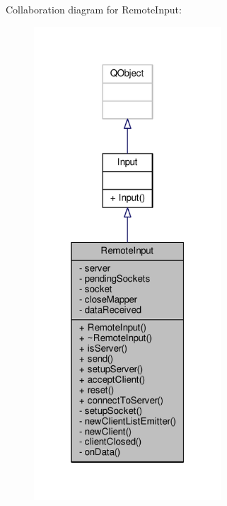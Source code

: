 Collaboration diagram for Remote\+Input\+:
\nopagebreak
\begin{figure}[H]
\begin{center}
\leavevmode
\includegraphics[width=199pt]{classRemoteInput__coll__graph}
\end{center}
\end{figure}
